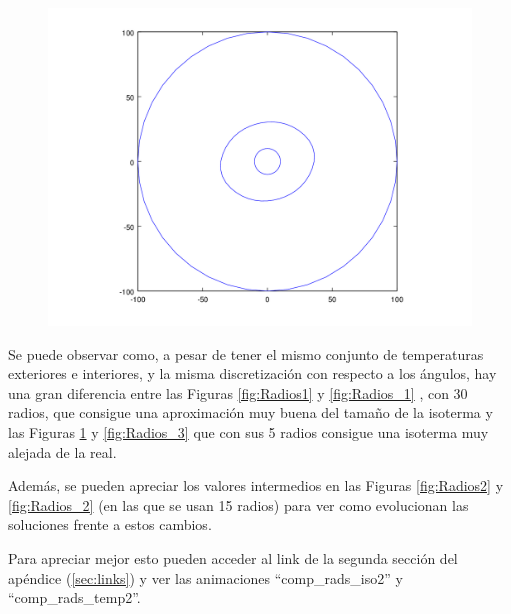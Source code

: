 \begin{figure}[H]
\begin{minipage}{0.30\textwidth}
  \centering
    \includegraphics[width=1\textwidth]{imgs/comp_rads_bueno/comp_radss_iso0.png} 
    \caption{} 
  \label{fig:Radios3}
\end{minipage}
\end{figure}

Se puede observar como, a pesar de tener el mismo conjunto de temperaturas exteriores e interiores, y la misma discretización con respecto a los ángulos, hay una gran diferencia entre las Figuras \ref{fig:Radios1} y \ref{fig:Radios_1} , con 30 radios, que consigue una aproximación muy buena del tamaño de la isoterma y las Figuras \ref{fig:Radios3} y \ref{fig:Radios_3} que con sus 5 radios consigue una isoterma muy alejada de la real.

Además, se pueden apreciar los valores intermedios en las Figuras \ref{fig:Radios2} y \ref{fig:Radios_2} (en las que se usan 15 radios) para ver como evolucionan las soluciones frente a estos cambios.

Para apreciar mejor esto pueden acceder al link de la segunda sección del apéndice (\ref{sec:links}) y ver las animaciones ``comp\_rads\_iso2'' y ``comp\_rads\_temp2''.









